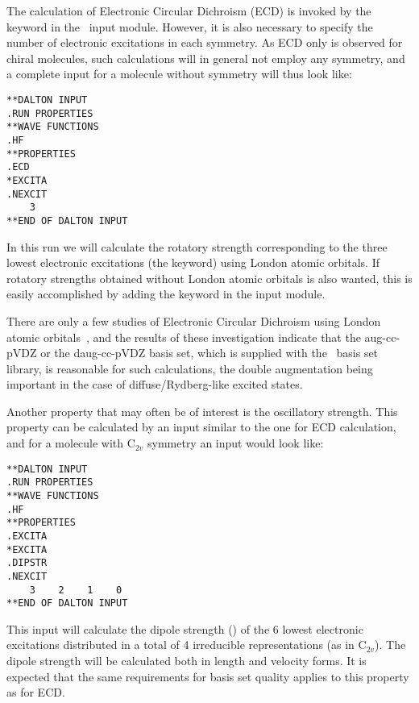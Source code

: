 The calculation of Electronic Circular Dichroism
(ECD) is invoked by 
the keyword  in the \aba\ input module. However,
it is also necessary to specify the number of electronic
excitations in 
each symmetry. As ECD only is observed for chiral molecules, such
calculations will in general not employ any symmetry, and a complete
input for a molecule without symmetry will thus look like:

\begin{verbatim}
**DALTON INPUT
.RUN PROPERTIES
**WAVE FUNCTIONS
.HF
**PROPERTIES
.ECD
*EXCITA
.NEXCIT
    3
**END OF DALTON INPUT
\end{verbatim}

In this run we will calculate the rotatory strength corresponding to 
the three lowest electronic excitations
(the  keyword) 
using London atomic orbitals. 
If rotatory strengths obtained without London atomic orbitals is also
wanted, this is easily accomplished by adding the keyword
 in the  input module.

There are only a few studies of Electronic Circular
Dichroism using London atomic
orbitals~\cite{klbaehkrthjopjtca90,mpkrthcpl388}, and the results of
these investigation indicate that the aug-cc-pVDZ or the daug-cc-pVDZ
basis set, which is supplied with the \siraba\ basis set library, is 
reasonable for such calculations, the double augmentation being
important in the case of diffuse/Rydberg-like excited states. 

Another property that may often be of interest is the
oscillatory strength. This property can be
calculated by an input 
similar to the one for ECD calculation, and for a molecule with
C$_{2v}$ symmetry an input would look like:

\begin{verbatim}
**DALTON INPUT
.RUN PROPERTIES
**WAVE FUNCTIONS
.HF
**PROPERTIES
.EXCITA
*EXCITA
.DIPSTR
.NEXCIT
    3    2    1    0
**END OF DALTON INPUT
\end{verbatim}

This input will calculate the dipole strength () of the
6 lowest electronic excitations distributed in a total of 4
irreducible representations (as in C$_{2v}$). The dipole strength will
be calculated both in 
length and velocity forms. It is expected that the same requirements
for basis set quality applies to this property as for ECD.

